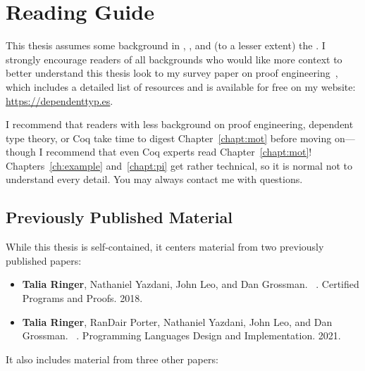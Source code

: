 \section{Reading Guide}
\label{sec:guide}


This thesis assumes some background in , , and (to a lesser extent) the  . 
I strongly encourage readers of all backgrounds who would like more context to better understand this thesis
look to my survey paper on proof engineering~\cite{PGL-045}, which includes a detailed list of resources
and is available for free on my website: \url{https://dependenttyp.es}.

I recommend that readers with less background on proof engineering, dependent type theory, or Coq
take time to digest Chapter~\ref{chapt:mot} before moving on---though I recommend that even Coq experts read Chapter~\ref{chapt:mot}!
Chapters~\ref{ch:example} and~\ref{chapt:pi} get rather technical, so it is normal not to understand every detail.
You may always contact me with questions.

\subsection*{Previously Published Material}

While this thesis is self-contained, it centers material from two previously published papers:

\begin{itemize}
\item \textbf{Talia Ringer}, Nathaniel Yazdani, John Leo, and Dan Grossman. ~\cite{ringer2018adapting}. Certified Programs and Proofs. 2018.
\item \textbf{Talia Ringer}, RanDair Porter, Nathaniel Yazdani, John Leo, and Dan Grossman. ~\cite{Ringer2021}. Programming Languages Design and Implementation. 2021.
\end{itemize}
It also includes material from three other papers:

